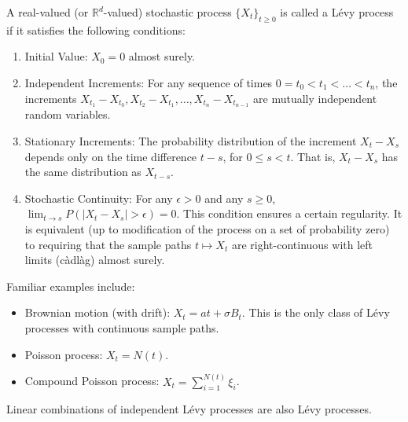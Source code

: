 \documentclass[11pt,twoside,openright]{report}
\begin{document}
A real-valued (or $\mathbb{R}^d$-valued) stochastic process $\{X_t\}_{t \ge 0}$ is called a Lévy process if it satisfies the following conditions:
\begin{enumerate}
    \item Initial Value: $X_0 = 0$ almost surely.
    \item Independent Increments: For any sequence of times $0 = t_0 < t_1 < \dots < t_n$, the increments $X_{t_1} - X_{t_0}, X_{t_2} - X_{t_1}, \dots, X_{t_n} - X_{t_{n-1}}$ are mutually independent random variables.
    \item Stationary Increments: The probability distribution of the increment $X_t - X_s$ depends only on the time difference $t-s$, for $0 \le s < t$. That is, $X_t - X_s$ has the same distribution as $X_{t-s}$.
    \item Stochastic Continuity: For any $\epsilon > 0$ and any $s \ge 0$, $\lim_{t \to s} P(|X_t - X_s| > \epsilon) = 0$. This condition ensures a certain regularity. It is equivalent (up to modification of the process on a set of probability zero) to requiring that the sample paths $t \mapsto X_t$ are right-continuous with left limits (càdlàg) almost surely.
\end{enumerate}
Familiar examples include:
\begin{itemize}
    \item Brownian motion (with drift): $X_t = at + \sigma B_t$. This is the only class of Lévy processes with continuous sample paths.
    \item Poisson process: $X_t = N(t)$.
    \item Compound Poisson process: $X_t = \sum_{i=1}^{N(t)} \xi_i$.
\end{itemize}
Linear combinations of independent Lévy processes are also Lévy processes.
\end{document}
